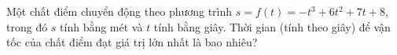 \begin{ex}
Một chất điểm chuyển động theo phương trình $s=f(t)=-t^3+6t^2+7t+8$, trong đó $s$ tính bằng mét và $t$ tính bằng giây. Thời gian (tính theo giây) để vận tốc của chất điểm đạt giá trị lớn nhất là bao nhiêu?
\end{ex}
